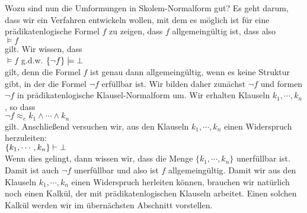 Wozu sind nun die Umformungen in Skolem-Normalform gut?  Es geht darum, dass wir 
ein Verfahren entwickeln wollen, mit dem es möglich ist für eine prädikatenlogische Formel
$f$ zu zeigen, dass $f$ allgemeingültig ist, dass also \\[0.2cm]
\hspace*{1.3cm} $\models f$ \\[0.2cm]
gilt.  Wir wissen, dass \\[0.2cm]
\hspace*{1.3cm} $\models f$ \quad g.d.w. \quad $\{\neg f\} \models \bot$ \\[0.2cm]
gilt, denn die Formel $f$ ist genau dann allgemeingültig, wenn es keine Struktur gibt, in
der die Formel $\neg f$ erfüllbar ist. 
 Wir bilden daher zunächst $\neg f$ und formen $\neg f$ in prädikatenlogische
Klausel-Normalform um.  Wir erhalten Klauseln $k_1, \cdots, k_n$, so dass  \\[0.2cm]
\hspace*{1.3cm} $\neg f \approx_e k_1 \wedge \cdots \wedge k_n$ \\[0.2cm]
gilt.  Anschließend versuchen wir,
aus den Klauseln $k_1,\cdots,k_n$ einen Widerspruch herzuleiten: \\[0.2cm]
\hspace*{1.3cm} $\{k_1, \cdots, k_n\} \vdash \bot$ \\[0.2cm]
Wenn dies gelingt, dann wissen wir, dass die Menge $\{k_1, \cdots, k_n\}$ unerfüllbar ist.
Damit ist auch $\neg f$ unerfüllbar und also ist $f$ allgemeingültig.
Damit wir aus den Klauseln $k_1,\cdots,k_n$ einen Widerspruch herleiten können,
brauchen wir natürlich noch einen Kalkül, der mit prädikatenlogischen Klauseln arbeitet. 
Einen solchen Kalkül werden wir im übernächsten Abschnitt vorstellen.

